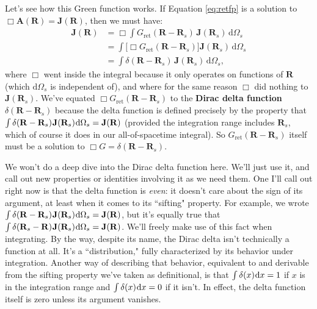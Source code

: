 \documentclass[12pt]{article}
\renewcommand{\vv}[1]{\mathbf{#1}}
\newcommand{\dd}[1]{\mathrm{d}#1}
\begin{document}
Let's see how this Green function works. If Equation \ref{eq:retfp} is a solution to $\Box \vv A (\vv R) = \vv J (\vv R)$, then we must have:
\begin{equation*}
\begin{aligned}
\vv J (\vv R) &= \Box \int G_{\textrm{ret}} ( \vv R - \vv R_{s} ) \, \vv J (\vv R _{s}) \, \dd \Omega_{s} \\[3pt]
& = \int \Big[ \Box G_{\textrm{ret}} ( \vv R - \vv R_{s} ) \Big] \vv J (\vv R _{s}) \, \dd \Omega_{s} \\[3pt]
&= \int \delta ( \vv R - \vv R_{s} ) \, \vv J (\vv R _{s}) \, \dd \Omega_{s} ,
\end{aligned}
\end{equation*}
where $\Box$ went inside the integral because it only operates on functions of $\vv R$ (which $\dd \Omega_{s}$ is independent of), and where for the same reason $\Box$ did nothing to $\vv J(\vv R_{s})$. We've equated $\Box G_{\textrm{ret}}( \vv R - \vv R_{s} )$ to the \textbf{Dirac delta function} $\delta ( \vv R - \vv R_{s} )$ because the delta function is defined precisely by the property that $\int \delta (\vv R - \vv R_{s}) \mkern1mu \vv J (\vv R_{s}) \mkern1mu \dd \Omega_{s} = \vv J (\vv R)$ (provided the integration range includes $\vv R_{s}$, which of course it does in our all-of-spacetime integral). So $G_{\textrm{ret}}( \vv R - \vv R_{s} )$ itself must be a solution to $\Box G = \delta ( \vv R - \vv R_{s} )$.

We won't do a deep dive into the Dirac delta function here. We'll just use it, and call out new properties or identities involving it as we need them. One I'll call out right now is that the delta function is \emph{even}: it doesn't care about the sign of its argument, at least when it comes to its ``sifting" property. For example, we wrote $\int \delta (\vv R - \vv R_{s}) \mkern1mu \vv J (\vv R_{s}) \mkern1mu \dd \Omega_{s} = \vv J (\vv R)$, but it's equally true that $\int \delta (\vv R_{s} - \vv R) \mkern1mu \vv J (\vv R_{s}) \mkern1mu \dd \Omega_{s} = \vv J (\vv R)$. We'll freely make use of this fact when integrating. By the way, despite its name, the Dirac delta isn't technically a function at all. It's a ``distribution," fully characterized by its behavior under integration. Another way of describing that behavior, equivalent to and derivable from the sifting property we've taken as definitional, is that $\int \delta (x) \mkern1mu \dd x = 1$ if $x$ is in the integration range and $\int \delta (x) \mkern1mu \dd x = 0$ if it isn't. In effect, the delta function itself is zero unless its argument vanishes.
\end{document}
